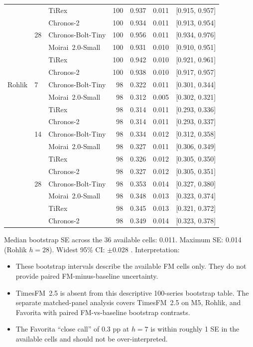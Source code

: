 \begin{table}[htbp]
\begin{tabular}{lllrrrr}
         &    & TiRex             & 100 & 0.937 & 0.011 & [0.915, 0.957] \\
         &    & Chronos-2         & 100 & 0.934 & 0.011 & [0.913, 0.954] \\
\addlinespace
         & 28 & Chronos-Bolt-Tiny & 100 & 0.956 & 0.011 & [0.934, 0.976] \\
         &    & Moirai~2.0-Small  & 100 & 0.931 & 0.010 & [0.910, 0.951] \\
         &    & TiRex             & 100 & 0.942 & 0.010 & [0.921, 0.961] \\
         &    & Chronos-2         & 100 & 0.938 & 0.010 & [0.917, 0.957] \\
\addlinespace
Rohlik   & 7  & Chronos-Bolt-Tiny &  98 & 0.322 & 0.011 & [0.301, 0.344] \\
         &    & Moirai~2.0-Small  &  98 & 0.312 & 0.005 & [0.302, 0.321] \\
         &    & TiRex             &  98 & 0.314 & 0.011 & [0.293, 0.336] \\
         &    & Chronos-2         &  98 & 0.314 & 0.011 & [0.293, 0.337] \\
\addlinespace
         & 14 & Chronos-Bolt-Tiny &  98 & 0.334 & 0.012 & [0.312, 0.358] \\
         &    & Moirai~2.0-Small  &  98 & 0.327 & 0.011 & [0.306, 0.349] \\
         &    & TiRex             &  98 & 0.326 & 0.012 & [0.305, 0.350] \\
         &    & Chronos-2         &  98 & 0.327 & 0.012 & [0.305, 0.351] \\
\addlinespace
         & 28 & Chronos-Bolt-Tiny &  98 & 0.353 & 0.014 & [0.327, 0.380] \\
         &    & Moirai~2.0-Small  &  98 & 0.348 & 0.013 & [0.323, 0.374] \\
         &    & TiRex             &  98 & 0.345 & 0.013 & [0.321, 0.372] \\
         &    & Chronos-2         &  98 & 0.349 & 0.014 & [0.323, 0.378] \\
\bottomrule
\end{tabular}
\end{table}

Median bootstrap SE across the 36 available cells: 0.011. Maximum SE:
0.014 (Rohlik $h = 28$). Widest 95\% CI: $\pm$0.028 \WAPE{}.
Interpretation:

\begin{itemize}[nosep]
  \item These bootstrap intervals describe the available FM cells only.
    They do not provide paired FM-minus-baseline uncertainty.
  \item TimesFM~2.5 is absent from this descriptive 100-series bootstrap
    table.  The separate matched-panel analysis covers TimesFM~2.5 on
    M5, Rohlik, and Favorita with paired FM-vs-baseline bootstrap contrasts.
  \item The Favorita ``close call'' of 0.3 pp at $h = 7$ is within
    roughly 1 SE in the available cells and should not be over-interpreted.
\end{itemize}

